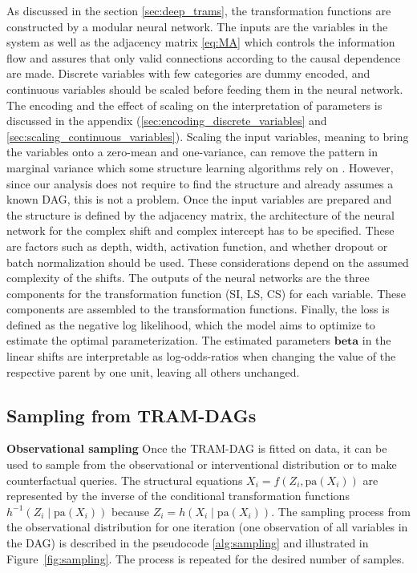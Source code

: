 As discussed in the section \ref{sec:deep_trams}, the transformation functions are constructed by a modular neural network. The inputs are the variables in the system as well as the adjacency matrix \ref{eq:MA} which controls the information flow and assures that only valid connections according to the causal dependence are made. Discrete variables with few categories are dummy encoded, and continuous variables should be scaled before feeding them in the neural network. The encoding and the effect of scaling on the interpretation of parameters is discussed in the appendix (\ref{sec:encoding_discrete_variables} and  \ref{sec:scaling_continuous_variables}). Scaling the input variables, meaning to bring the variables onto a zero-mean and one-variance, can remove the pattern in marginal variance which some structure learning algorithms rely on \citep{reisach2021}. However, since our analysis does not require to find the structure and already assumes a known DAG, this is not a problem. 
Once the input variables are prepared and the structure is defined by the adjacency matrix, the architecture of the neural network for the complex shift and complex intercept has to be specified. These are factors such as depth, width, activation function, and whether dropout or batch normalization should be used. These considerations depend on the assumed complexity of the shifts. The outputs of the neural networks are the three components for the transformation function (SI, LS, CS) for each variable. These components are assembled to the transformation functions. Finally, the loss is defined as the negative log likelihood, which the model aims to optimize to estimate the optimal parameterization. The estimated parameters $\boldsymbol{beta}$ in the linear shifts are interpretable as log-odds-ratios when changing the value of the respective parent by one unit, leaving all others unchanged. 




\subsection{Sampling from TRAM-DAGs}

\textbf{Observational sampling} Once the TRAM-DAG is fitted on data, it can be used to sample from the observational or interventional distribution or to make counterfactual queries. 
The structural equations $X_i = f(Z_i, \text{pa}(X_i))$ are represented by the inverse of the conditional transformation functions $h^{-1}(Z_i \mid \text{pa}(X_i))$ because $Z_i = h(X_i \mid \text{pa}(X_i))$. The sampling process from the observational distribution for one iteration (one observation of all variables in the DAG) is described in the pseudocode \ref{alg:sampling} and illustrated in Figure~\ref{fig:sampling}. The process is repeated for the desired number of samples. 

